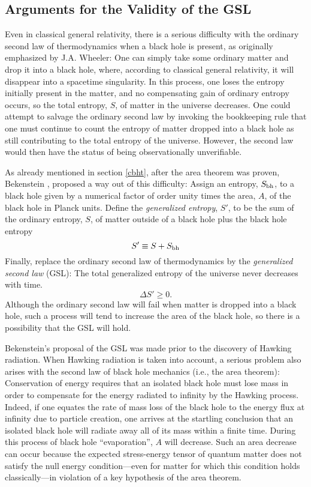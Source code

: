 \subsection{Arguments for the Validity of the GSL}
\label{av}

Even in classical general relativity, there is a serious difficulty
with the ordinary second law of thermodynamics when a black hole is
present, as originally emphasized by J.A. Wheeler: One can simply take
some ordinary matter and drop it into a black hole, where, according
to classical general relativity, it will disappear into a spacetime
singularity. In this process, one loses the entropy initially present
in the matter, and no compensating gain of ordinary entropy occurs, so
the total entropy, $S$, of matter in the universe decreases. One could
attempt to salvage the ordinary second law by invoking the bookkeeping
rule that one must continue to count the entropy of matter dropped
into a black hole as still contributing to the total entropy of the
universe.  However, the second law would then have the status of being
observationally unverifiable.

As already mentioned in section \ref{cbht}, after the area theorem was
proven, Bekenstein \cite{b1}, \cite{b2} proposed a way out of this
difficulty: Assign an entropy, $S_{\rm bh}$, to a black hole given by a
numerical factor of order unity times the area, $A$, of the black hole in
Planck units. Define the {\it generalized entropy}, $S'$, to be the sum of
the ordinary entropy, $S$, of matter outside of a black hole plus the black
hole entropy
\begin{equation}
S' \equiv S + S_{\rm bh}
\label{S'}
\end{equation}
Finally, replace the ordinary second law of thermodynamics by the {\it
generalized second law} (GSL): The total generalized entropy of the
universe never decreases with time.
\begin{equation}
\Delta S' \geq 0 .
\label{GSL}
\end{equation}
Although the ordinary second law will fail when matter is dropped into
a black hole, such a process will tend to increase the area of the
black hole, so there is a possibility that the GSL will hold.

Bekenstein's proposal of the GSL was made prior to the discovery of
Hawking radiation. When Hawking radiation is taken into account, a
serious problem also arises with the second law of black hole
mechanics (i.e., the area theorem): Conservation of energy requires
that an isolated black hole must lose mass in order to compensate for
the energy radiated to infinity by the Hawking process. Indeed, if one
equates the rate of mass loss of the black hole to the energy flux at
infinity due to particle creation, one arrives at the startling
conclusion that an isolated black hole will radiate away all of its
mass within a finite time. During this process of black hole
``evaporation'', $A$ will decrease. Such an area decrease can occur
because the expected stress-energy tensor of quantum matter does not
satisfy the null energy condition---even for matter for which this
condition holds classically---in violation of a key hypothesis of the
area theorem.

